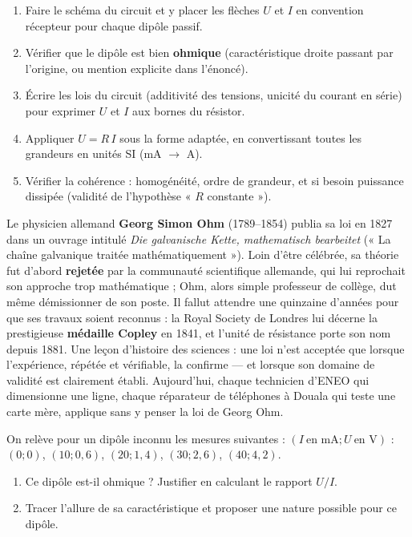 \documentclass[11pt]{article}
\begin{document}
\begin{methode}
\begin{enumerate}
\item Faire le schéma du circuit et y placer les flèches $U$ et $I$ en convention récepteur pour chaque dipôle passif.
\item Vérifier que le dipôle est bien \textbf{ohmique} (caractéristique droite passant par l'origine, ou mention explicite dans l'énoncé).
\item Écrire les lois du circuit (additivité des tensions, unicité du courant en série) pour exprimer $U$ et $I$ aux bornes du résistor.
\item Appliquer $U = R\,I$ sous la forme adaptée, en convertissant toutes les grandeurs en unités SI (mA $\to$ A).
\item Vérifier la cohérence : homogénéité, ordre de grandeur, et si besoin puissance dissipée (validité de l'hypothèse « $R$ constante »).
\end{enumerate}
\end{methode}

\begin{savaistu}
Le physicien allemand \textbf{Georg Simon Ohm} (1789--1854) publia sa loi en 1827 dans un ouvrage intitulé \emph{Die galvanische Kette, mathematisch bearbeitet} (« La chaîne galvanique traitée mathématiquement »). Loin d'être célébrée, sa théorie fut d'abord \textbf{rejetée} par la communauté scientifique allemande, qui lui reprochait son approche trop mathématique ; Ohm, alors simple professeur de collège, dut même démissionner de son poste. Il fallut attendre une quinzaine d'années pour que ses travaux soient reconnus : la Royal Society de Londres lui décerne la prestigieuse \textbf{médaille Copley} en 1841, et l'unité de résistance porte son nom depuis 1881. Une leçon d'histoire des sciences : une loi n'est acceptée que lorsque l'expérience, répétée et vérifiable, la confirme — et lorsque son domaine de validité est clairement établi. Aujourd'hui, chaque technicien d'ENEO qui dimensionne une ligne, chaque réparateur de téléphones à Douala qui teste une carte mère, applique sans y penser la loi de Georg Ohm.
\end{savaistu}

\begin{exercice}
On relève pour un dipôle inconnu les mesures suivantes : $(I\ \text{en mA} ; U\ \text{en V})$ : $(0;0)$, $(10;0{,}6)$, $(20;1{,}4)$, $(30;2{,}6)$, $(40;4{,}2)$.
\begin{enumerate}
\item Ce dipôle est-il ohmique ? Justifier en calculant le rapport $U/I$.
\item Tracer l'allure de sa caractéristique et proposer une nature possible pour ce dipôle.
\end{enumerate}
\end{exercice}
\end{document}
